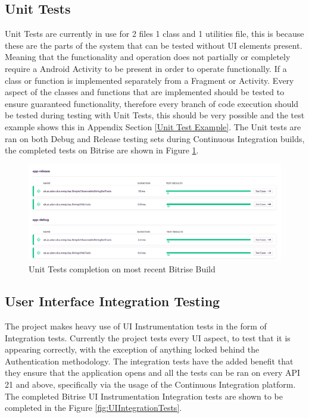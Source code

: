     \subsection{Unit Tests}
    Unit Tests are currently in use for 2 files 1 class and 1 utilities file, this is because these are the parts of the system that can be tested without UI elements present. Meaning that the functionality and operation does not partially or completely require a Android Activity to be present in order to operate functionally. If a class or function is implemented separately from a Fragment or Activity. Every aspect of the classes and functions that are implemented should be tested to ensure guaranteed functionality, therefore every branch of code execution should be tested during testing with Unit Tests, this should be very possible and the test example shows this in Appendix Section \ref{Unit Test Example}. The Unit tests are ran on both Debug and Release testing sets during Continuous Integration builds, the completed tests on Bitrise are shown in Figure \ref{fig:UnitTestsStatus}.
    
    \begin{figure} [htbp!]
        \centering
        \includegraphics[width=\textwidth]{Images/UnitTestsBitrise.PNG}
        \caption{Unit Tests completion on most recent Bitrise Build}
        \label{fig:UnitTestsStatus}
    \end{figure}
    
    \subsection{User Interface Integration Testing}
    The project makes heavy use of UI Instrumentation tests in the form of Integration tests. Currently the project tests every UI aspect, to test that it is appearing correctly, with the exception of anything locked behind the Authentication methodology. The integration tests have the added benefit that they ensure that the application opens and all the tests can be ran on every API 21 and above, specifically via the usage of the Continuous Integration platform. The completed Bitrise UI Instrumentation Integration tests are shown to be completed in the Figure \ref{fig:UIIntegrationTests}.
    
